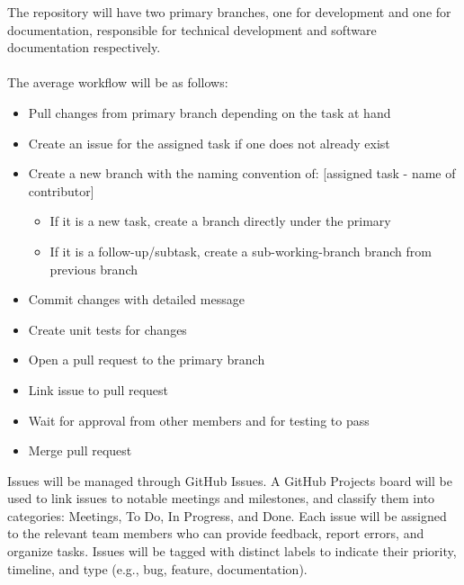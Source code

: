 \documentclass{article}
\begin{document}
The repository will have two primary branches, one for development and one for documentation, responsible for technical development and software documentation respectively.
\\\\
The average workflow will be as follows: \\
\begin{itemize}
  \item Pull changes from primary branch depending on the task at hand
  \item Create an issue for the assigned task if one does not already exist
  \item Create a new branch with the naming convention of: [assigned task - name of contributor]
  \begin{itemize}
    \item If it is a new task, create a branch directly under the primary
    \item If it is a follow-up/subtask, create a sub-working-branch branch from previous branch
  \end{itemize}
  \item Commit changes with detailed message
  \item Create unit tests for changes
  \item Open a pull request to the primary branch
  \item Link issue to pull request
  \item Wait for approval from other members and for testing to pass
  \item Merge pull request
\end{itemize}

Issues will be managed through GitHub Issues. A GitHub Projects board will be used to link issues to notable meetings and milestones, and classify them into categories: Meetings, To Do, In Progress, and Done. Each issue will be assigned to the relevant team members who can provide feedback, report errors, and organize tasks. Issues will be tagged with distinct labels to indicate their priority, timeline, and type (e.g., bug, feature, documentation).
\\
\end{document}
